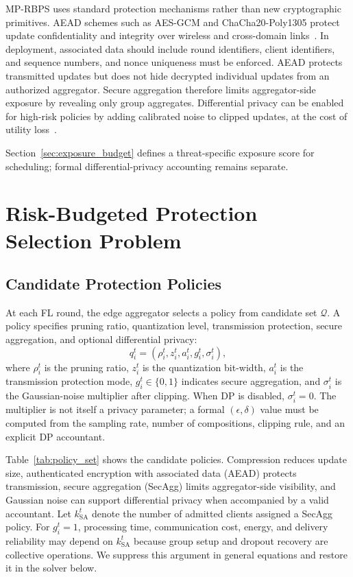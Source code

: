 \documentclass[preprint,12pt]{elsarticle}
\begin{document}
MP-RBPS uses standard protection mechanisms rather than new cryptographic primitives. AEAD schemes such as AES-GCM and ChaCha20-Poly1305 protect update confidentiality and integrity over wireless and cross-domain links~\cite{nist2007gcm,rfc8439}. In deployment, associated data should include round identifiers, client identifiers, and sequence numbers, and nonce uniqueness must be enforced. AEAD protects transmitted updates but does not hide decrypted individual updates from an authorized aggregator. Secure aggregation therefore limits aggregator-side exposure by revealing only group aggregates. Differential privacy can be enabled for high-risk policies by adding calibrated noise to clipped updates, at the cost of utility loss~\cite{wei2023pfl_dp,yuan2023amplitude,yuan2023privacyresource}.

Section~\ref{sec:exposure_budget} defines a threat-specific exposure score for scheduling; formal differential-privacy accounting remains separate.

\section{Risk-Budgeted Protection Selection Problem}

\subsection{Candidate Protection Policies}

At each FL round, the edge aggregator selects a policy from candidate set $\mathcal{Q}$. A policy specifies pruning ratio, quantization level, transmission protection, secure aggregation, and optional differential privacy:
\begin{equation}
	q_i^t = \left(\rho_i^t, z_i^t, a_i^t, g_i^t, \sigma_i^t\right),
	\label{eq:policy_tuple}
\end{equation}
where $\rho_i^t$ is the pruning ratio, $z_i^t$ is the quantization bit-width, $a_i^t$ is the transmission protection mode, $g_i^t\in\{0,1\}$ indicates secure aggregation, and $\sigma_i^t$ is the Gaussian-noise multiplier after clipping. When DP is disabled, $\sigma_i^t=0$. The multiplier is not itself a privacy parameter; a formal $(\epsilon,\delta)$ value must be computed from the sampling rate, number of compositions, clipping rule, and an explicit DP accountant.

Table~\ref{tab:policy_set} shows the candidate policies. Compression reduces update size, authenticated encryption with associated data (AEAD) protects transmission, secure aggregation (SecAgg) limits aggregator-side visibility, and Gaussian noise can support differential privacy when accompanied by a valid accountant. Let $k_{\mathrm{SA}}^t$ denote the number of admitted clients assigned a SecAgg policy. For $g_i^t=1$, processing time, communication cost, energy, and delivery reliability may depend on $k_{\mathrm{SA}}^t$ because group setup and dropout recovery are collective operations. We suppress this argument in general equations and restore it in the solver below.
\end{document}

